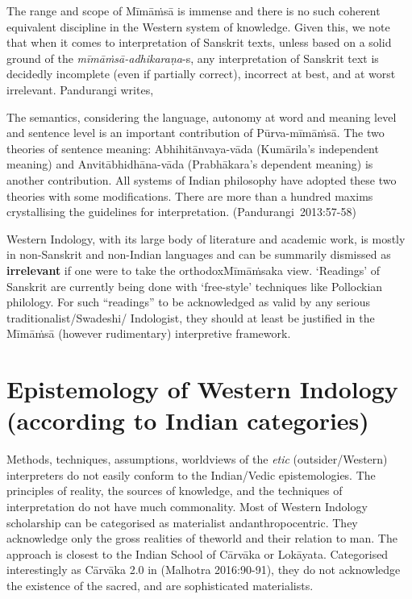 The range and scope of Mīmāṁsā is immense and there is no such coherent equivalent discipline in the Western system of knowledge. Given this, we note that when it comes to interpretation of Sanskrit texts, unless based on a solid ground of the \hbox{{\sl mīmāṁsā-adhikaraṇa}-s,} any interpretation of Sanskrit text is decidedly incomplete (even if partially correct), incorrect at best, and at worst irrelevant. Pandurangi writes,
\begin{myquote}
The semantics, considering the language, autonomy at word and meaning level and sentence level is an important contribution of Pūrva-mīmāṁ\-sā. The two theories of sentence meaning: Abhihitānvaya-vāda (Kumārila's independent meaning) and Anvitābhidhāna-vāda (Prabhākara's dependent meaning) is another contribution. All systems of Indian philosophy have adopted these two theories with some modifications. There are more than a hundred maxims crystallising the guidelines for interpretation. \hfill \hbox{(Pandurangi 2013:57-58)}
\end{myquote}

Western Indology, with its large body of literature and academic work, is mostly in non-Sanskrit and non-Indian languages and can be summarily dismissed as {\bf irrelevant} if one were to take the orthodox\break Mīmāṁsaka view. `Readings' of Sanskrit are currently being done with `free-style' techniques like Pollockian philology. For such ``readings'' to be acknowledged as valid by any serious traditionalist/Swadeshi/ Indologist, they should at least be justified in the Mīmāṁsā (however rudimentary) interpretive framework. 

\newpage

\section*{Epistemology of Western Indology (according to Indian categories)}

Methods, techniques, assumptions, worldviews of the {\sl etic} (outsider/\break Western) interpreters do not easily conform to the Indian/Vedic epistemologies. The principles of reality, the sources of knowledge, and the techniques of interpretation do not have much commonality. Most of Western Indology scholarship can be categorised as materialist and\break anthropocentric. They acknowledge only the gross realities of the\break world and their relation to man. The approach is closest to the Indian School of Cārvāka or Lokāyata. Categorised interestingly as Cārvāka 2.0 in (Malhotra 2016:90-91), they do not acknowledge the existence of the sacred, and are sophisticated materialists.

